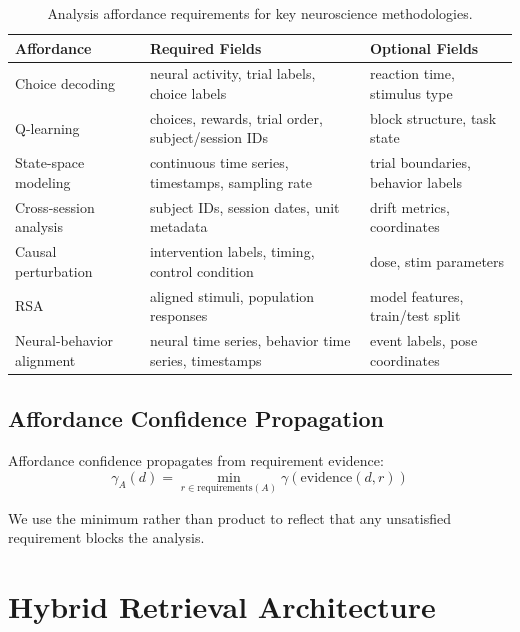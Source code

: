 \documentclass{article}
\theoremstyle{definition}
\newcommand{\confidence}{\gamma}
\begin{document}
\begin{table}[t]
\centering
\small
\caption{Analysis affordance requirements for key neuroscience methodologies.}
\label{tab:affordance-requirements}
\begin{tabular}{lp{4cm}p{4cm}}
\toprule
\textbf{Affordance} & \textbf{Required Fields} & \textbf{Optional Fields} \\
\midrule
Choice decoding & neural activity, trial labels, choice labels & reaction time, stimulus type \\
Q-learning & choices, rewards, trial order, subject/session IDs & block structure, task state \\
State-space modeling & continuous time series, timestamps, sampling rate & trial boundaries, behavior labels \\
Cross-session analysis & subject IDs, session dates, unit metadata & drift metrics, coordinates \\
Causal perturbation & intervention labels, timing, control condition & dose, stim parameters \\
RSA & aligned stimuli, population responses & model features, train/test split \\
Neural-behavior alignment & neural time series, behavior time series, timestamps & event labels, pose coordinates \\
\bottomrule
\end{tabular}
\end{table}

\subsection{Affordance Confidence Propagation}

Affordance confidence propagates from requirement evidence:
\begin{equation}
\confidence_A(d) = \min_{r \in \text{requirements}(A)} \confidence(\text{evidence}(d, r))
\end{equation}

We use the minimum rather than product to reflect that any unsatisfied requirement blocks the analysis.

\section{Hybrid Retrieval Architecture}
\label{sec:retrieval}
\end{document}
